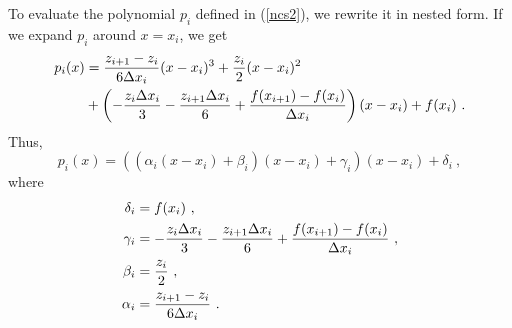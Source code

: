 To evaluate the polynomial $p_i$ defined in (\ref{ncs2}), we rewrite
it in nested form.  If we expand $p_i$ around $x = x_i$, we get
\begin{align*}
p_i(x) &= \frac{z_{i+1}-z_i}{6 \Delta{x_i}} (x-x_i)^3
+ \frac{z_i}{2} (x-x_i)^2 \\
&+ \left(-\frac{z_i \Delta{x_i}}{3} - \frac{z_{i+1} \Delta{x_i}}{6} +
\frac{f(x_{i+1})-f(x_i)}{\Delta{x_i}}\right) (x-x_i) + f(x_i) \ .
\end{align*}
Thus,
\begin{equation}\label{ncs3}
p_i(x) = \left(\left(\alpha_i(x-x_i) + \beta_i\right)(x-x_i)
+\gamma_i\right)(x-x_i) + \delta_i \ ,
\end{equation}
where
\begin{equation}\label{ncs7}
\begin{split}
\delta_i &= f(x_i) \ ,\\
\gamma_i &= -\frac{z_i \Delta{x_i}}{3} - \frac{z_{i+1} \Delta{x_i}}{6} +
\frac{f(x_{i+1})-f(x_i)}{\Delta{x_i}} \ ,\\
\beta_i &= \frac{z_i}{2} \ ,\\
\alpha_i &= \frac{z_{i+1}-z_i}{6 \Delta{x_i}} \ .
\end{split}
\end{equation}

